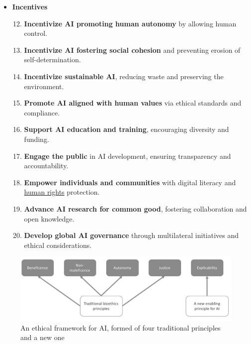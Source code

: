 \begin{itemize}
    \item \textbf{Incentives}
    \begin{enumerate}[label*=\arabic*.]
        \setcounter{enumi}{11}
        \item \textbf{Incentivize AI promoting human autonomy} by allowing human control.
        \item \textbf{Incentivize AI fostering social cohesion} and preventing erosion of self-determination.
        \item \textbf{Incentivize sustainable AI}, reducing waste and preserving the environment.
        \item \textbf{Promote AI aligned with human values} via ethical standards and compliance.
        \item \textbf{Support AI education and training}, encouraging diversity and funding.
        \item \textbf{Engage the public} in AI development, ensuring transparency and accountability.
        \item \textbf{Empower individuals and communities} with digital literacy and \hyperref[sec:AIHumanRights]{human rights} protection.
        \item \textbf{Advance AI research for common good}, fostering collaboration and open knowledge.
        \item \textbf{Develop global AI governance} through multilateral initiatives and ethical considerations.
    \end{enumerate}
\end{itemize}

\begin{figure}[h]
    \centering
    \includegraphics[width=0.75\linewidth]{Assets/AI Framework.png}
    \caption{An ethical framework for AI, formed of four traditional principles and a new one}
\end{figure}
